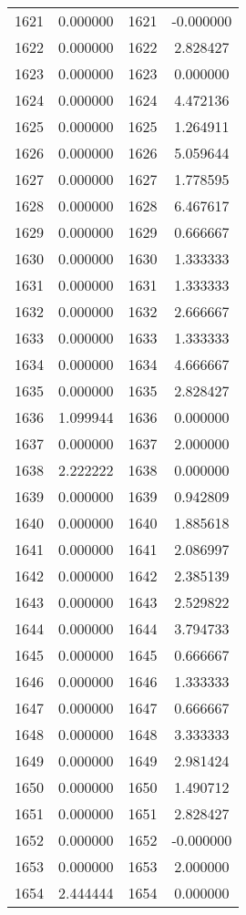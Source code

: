 \documentclass[12pt]{article}
\begin{document}
\begin{longtable}{@{}cccc@{}}
1621 & 0.000000 & 1621 & -0.000000 \\
1622 & 0.000000 & 1622 & 2.828427 \\
1623 & 0.000000 & 1623 & 0.000000 \\
1624 & 0.000000 & 1624 & 4.472136 \\
1625 & 0.000000 & 1625 & 1.264911 \\
1626 & 0.000000 & 1626 & 5.059644 \\
1627 & 0.000000 & 1627 & 1.778595 \\
1628 & 0.000000 & 1628 & 6.467617 \\
1629 & 0.000000 & 1629 & 0.666667 \\
1630 & 0.000000 & 1630 & 1.333333 \\
1631 & 0.000000 & 1631 & 1.333333 \\
1632 & 0.000000 & 1632 & 2.666667 \\
1633 & 0.000000 & 1633 & 1.333333 \\
1634 & 0.000000 & 1634 & 4.666667 \\
1635 & 0.000000 & 1635 & 2.828427 \\
1636 & 1.099944 & 1636 & 0.000000 \\
1637 & 0.000000 & 1637 & 2.000000 \\
1638 & 2.222222 & 1638 & 0.000000 \\
1639 & 0.000000 & 1639 & 0.942809 \\
1640 & 0.000000 & 1640 & 1.885618 \\
1641 & 0.000000 & 1641 & 2.086997 \\
1642 & 0.000000 & 1642 & 2.385139 \\
1643 & 0.000000 & 1643 & 2.529822 \\
1644 & 0.000000 & 1644 & 3.794733 \\
1645 & 0.000000 & 1645 & 0.666667 \\
1646 & 0.000000 & 1646 & 1.333333 \\
1647 & 0.000000 & 1647 & 0.666667 \\
1648 & 0.000000 & 1648 & 3.333333 \\
1649 & 0.000000 & 1649 & 2.981424 \\
1650 & 0.000000 & 1650 & 1.490712 \\
1651 & 0.000000 & 1651 & 2.828427 \\
1652 & 0.000000 & 1652 & -0.000000 \\
1653 & 0.000000 & 1653 & 2.000000 \\
1654 & 2.444444 & 1654 & 0.000000 \\

\end{longtable}
\end{document}
